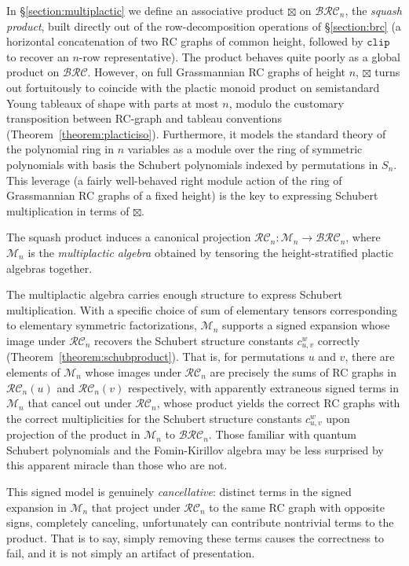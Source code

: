 \documentclass{amsart}
\theoremstyle{definition}
\theoremstyle{remark}
\numberwithin{equation}{subsection}
\newcommand{\clp}{\mathtt{clip}}
\newcommand{\BRC}{\mathcal{BRC}}
\newcommand{\RC}{\mathcal{RC}}
\begin{document}
In \S\ref{section:multiplactic} we define an associative product $\boxtimes$ on $\BRC_n$, the \emph{squash product}, built directly out of the row-decomposition operations of \S\ref{section:brc} (a horizontal concatenation of two RC graphs of common height, followed by $\clp$ to recover an $n$-row representative). The product behaves quite poorly as a global product on $\BRC$. However, on full Grassmannian RC graphs of height $n$, $\boxtimes$ turns out fortuitously to coincide with the plactic monoid product on semistandard Young tableaux of shape with parts at most $n$, modulo the customary transposition between RC-graph and tableau conventions (Theorem~\ref{theorem:placticiso}). Furthermore, it models the standard theory of the polynomial ring in $n$ variables as a module over the ring of symmetric polynomials with basis the Schubert polynomials indexed by permutations in $S_n$. This leverage (a fairly well-behaved right module action of the ring of Grassmannian RC graphs of a fixed height) is the key to expressing Schubert multiplication in terms of $\boxtimes$. 

The squash product induces a canonical projection $\RC_n:\mathcal{M}_n\to\BRC_n$, where $\mathcal{M}_n$ is the \emph{multiplactic algebra} obtained by tensoring the height-stratified plactic algebras together.

The multiplactic algebra carries enough structure to express Schubert multiplication. With a specific choice of sum of elementary tensors corresponding to elementary symmetric factorizations, $\mathcal{M}_n$ supports a signed expansion whose image under $\RC_n$ recovers the Schubert structure constants $c_{u,v}^w$ correctly (Theorem~\ref{theorem:schubproduct}). That is, for permutations $u$ and $v$, there are elements of $\mathcal{M}_n$ whose images under $\RC_n$ are precisely the sums of RC graphs in $\RC_n(u)$ and $\RC_n(v)$ respectively, with apparently extraneous signed terms in $\mathcal{M}_n$ that cancel out under $\RC_n$, whose product yields the correct RC graphs with the correct multiplicities for the Schubert structure constants $c_{u,v}^w$ upon projection of the product in $\mathcal{M}_n$ to $\BRC_n$. Those familiar with quantum Schubert polynomials and the Fomin-Kirillov algebra may be less surprised by this apparent miracle than those who are not.


This signed model is genuinely \emph{cancellative}: distinct terms in the signed expansion in $\mathcal{M}_n$ that project under $\RC_n$ to the same RC graph with opposite signs, completely canceling, unfortunately can contribute nontrivial terms to the product. That is to say, simply removing these terms causes the correctness to fail, and it is not simply an artifact of presentation.
\end{document}
